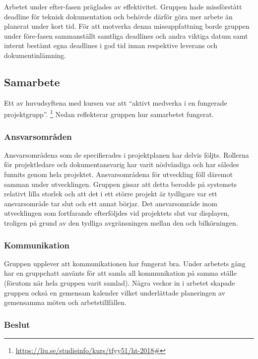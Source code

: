 \documentclass[10pt,oneside,swedish]{lips}
\begin{document}
Arbetet under efter-fasen präglades av effektivitet. Gruppen hade missförstått
deadline för teknisk dokumentation och behövde därför göra mer arbete än
planerat under kort tid. För att motverka denna missuppfattning borde gruppen
under före-fasen sammanställt samtliga deadlines och andra viktiga datum samt
internt bestämt egna deadlines i god tid innan respektive leverans och
dokumentinlämning.

\subsection{Samarbete}

Ett av huvudsyftena med kursen var att ``aktivt medverka i en fungerade
projektgrupp''. \footnote{\url{https://liu.se/studieinfo/kurs/tfyy51/ht-2018#}}
Nedan reflekterar gruppen hur samarbetet fungerat.

\subsubsection{Ansvarsområden}

Ansvarsområdena som de specifierades i projektplanen har delvis följts.
Rollerna för projektledare och dokumentansvarig har varit nödvändiga och har
således funnits genom hela projektet. Ansvarsområdena för utveckling föll
däremot samman under utvecklingen. Gruppen gissar att detta berodde på systemets
relativt lilla storlek och att det i ett större projekt är tydligare var ett
ansvarsområde tar slut och ett annat börjar. Det ansvarsområde inom utvecklingen
som fortfarande efterföljdes vid projektets slut var displayen, troligen på
grund av den tydliga avgränsningen mellan den och bilkörningen.

\subsubsection{Kommunikation}

Gruppen upplever att kommunikationen har fungerat bra. Under arbetets gång har
en gruppchatt använts för att samla all kommunikation på samma ställe (förutom
när hela gruppen varit samlad). Några veckor in i arbetet skapade gruppen också
en gemensam kalender vilket underlättade planeringen av gemensamma möten och
arbetstillfällen.

\subsubsection{Beslut}
\end{document}
